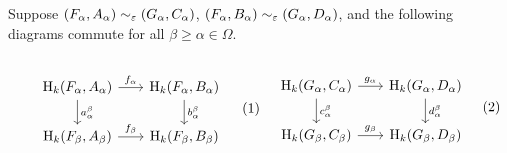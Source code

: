\begin{lemma}\label{lem:short_pair_inter}
  Suppose $(F_\alpha, A_\alpha)\sim_{\varepsilon} (G_\alpha, C_\alpha)$, $(F_\alpha, B_\alpha)\sim_\varepsilon (G_\alpha, D_\alpha)$, and the following diagrams commute for all $\beta\geq \alpha\in \Omega$.

  \vspace{3ex}\begin{subequations}
  \begin{minipage}{0.5\textwidth}\begin{equation}\label{dgm:fab}
  \begin{tikzcd}[column sep=scriptsize]
    \hom_k(F_\alpha, A_\alpha)\arrow{r}{f_\alpha}\arrow{d}{a_\alpha^\beta} &
    \hom_k(F_\alpha, B_\alpha)\arrow{d}{b_\alpha^\beta}\\
    \hom_k(F_\beta, A_\beta)\arrow{r}{f_\beta} &
    \hom_k(F_\beta, B_\beta)
  \end{tikzcd}\end{equation}\end{minipage}
  \begin{minipage}{0.5\textwidth}\begin{equation}\label{dgm:gcd}
  \begin{tikzcd}[column sep=scriptsize]
    \hom_k(G_\alpha, C_\alpha)\arrow{r}{g_\alpha}\arrow{d}{c_\alpha^\beta} &
    \hom_k(G_\alpha, D_\alpha)\arrow{d}{d_\alpha^\beta}\\
    \hom_k(G_\beta, C_\beta)\arrow{r}{g_\beta} &
    \hom_k(G_\beta, D_\beta)
  \end{tikzcd}\end{equation}\end{minipage}
  \end{subequations}\vspace{3ex}


\end{lemma}
